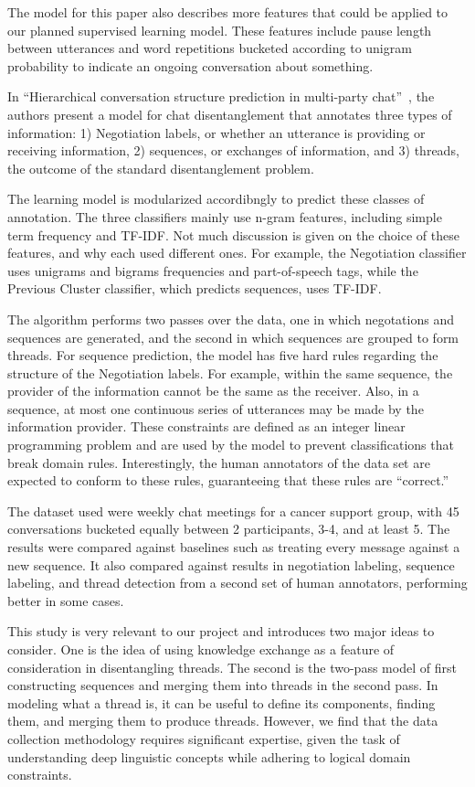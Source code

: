 \documentclass[11pt]{article}
\newcommand{\titlecite}[2]{``#1''~\cite{#2}}
\begin{document}
The model for this paper also describes more features that could be applied to
our planned supervised learning model. These features include pause length
between utterances and word repetitions bucketed according to unigram
probability to indicate an ongoing conversation about something.

In \titlecite{Hierarchical conversation structure prediction in multi-party
chat}{Mayfield2012a}, the authors present a model for chat disentanglement that annotates three types of
information: 1) Negotiation labels, or whether an utterance is providing or
receiving information, 2) sequences, or exchanges of information, and 3)
threads, the outcome of the standard disentanglement problem.

The learning model is modularized accordibngly to predict these classes of
annotation. The three classifiers mainly use n-gram features, including simple
term frequency and TF-IDF. Not much discussion is given on the choice of these
features, and why each used different ones. For example, the Negotiation
classifier uses unigrams and bigrams frequencies and part-of-speech tags, while
the Previous Cluster classifier, which predicts sequences, uses TF-IDF. 

The algorithm performs two passes over the data, one in which negotations and
sequences are generated, and the second in which sequences are grouped to form
threads. For sequence prediction, the model has five hard rules regarding the
structure of the Negotiation labels. For example, within the same sequence, the
provider of the information cannot be the same as the receiver. Also, in a
sequence, at most one continuous series of utterances may be made by the
information provider. These constraints are defined as an integer linear
programming problem and are used by the model to prevent classifications that
break domain rules. Interestingly, the human annotators of the data set are
expected to conform to these rules, guaranteeing that these rules are
“correct.”

The dataset used were weekly chat meetings for a cancer support group, with 45
conversations bucketed equally between 2 participants, 3-4, and at least 5. The
results were compared against baselines such as treating every message against
a new sequence. It also compared against results in negotiation labeling,
sequence labeling, and thread detection from a second set of human annotators,
performing better in some cases.

This study is very relevant to our project and introduces two major ideas to
consider. One is the idea of using knowledge exchange as a feature of
consideration in disentangling threads. The second is the two-pass model of
first constructing sequences and merging them into threads in the second pass.
In modeling what a thread is, it can be useful to define its components,
finding them, and merging them to produce threads. However, we find that the
data collection methodology requires significant expertise, given the task of
understanding deep linguistic concepts while adhering to logical domain
constraints.
\end{document}
